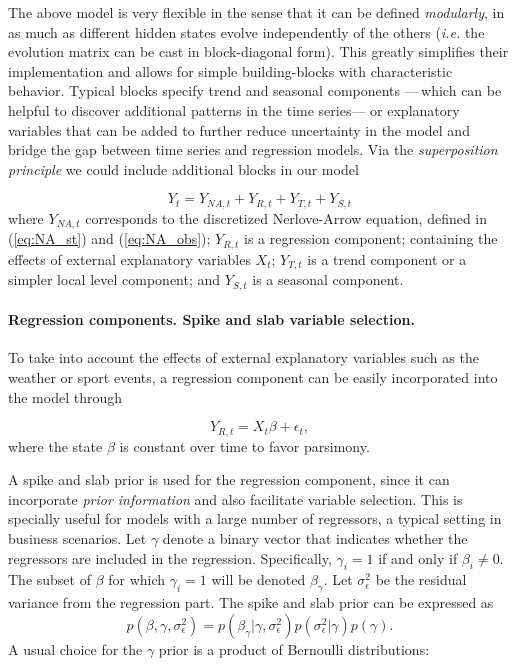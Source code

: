 The above model is very flexible in the sense that it can be defined \emph{modularly},  in as much as different hidden states evolve independently of the others (\emph{i.e.} the evolution matrix can be cast in block-diagonal form). This greatly simplifies their implementation and allows for simple building-blocks with characteristic behavior. Typical blocks specify trend and seasonal components ---\,which can be helpful to discover additional patterns in the time series--- or explanatory variables that can be added to further reduce  uncertainty in the model and bridge the gap between time series and regression models. Via the \emph{superposition principle} \parencite[Chapter 3]{petris2009dynamic} we could include additional blocks in our model

$$
Y_t = Y_{NA, t} + Y_{R, t} + Y_{T, t} + Y_{S, t}
$$
where $Y_{NA, t}$ corresponds to the discretized Nerlove-Arrow equation, defined in (\ref{eq:NA_st}) and (\ref{eq:NA_obs}); $Y_{R, t}$ is a regression component; containing the effects of  external explanatory variables $X_t$; $Y_{T, t}$ is a trend component or a simpler local level component; and $Y_{S, t}$ is a seasonal component.

\paragraph{Regression components. Spike and slab variable selection.}\label{sec:s_s}

To take into account the effects of external explanatory variables such as the weather or sport events, a  regression component can be easily incorporated into the model through

$$
Y_{R,t} = X_t \beta + \epsilon_t,
$$
where the state $\beta$ is constant over time to favor parsimony.

A spike and slab prior \parencite{mitchell1988bayesian} is used for the  regression component, since it can incorporate \emph{prior information} and also facilitate variable selection. This is specially useful for models with a large number of regressors, a typical setting in business scenarios.
Let $\gamma$ denote a binary vector that indicates whether the regressors are included in the regression. Specifically, $\gamma_i = 1$ if and only if $\beta_i \neq 0$. The subset of $\beta$ for which $\gamma_i = 1$ will be denoted $\beta_{\gamma}$. Let $\sigma^2_{\epsilon}$ be the residual variance from the regression part. The spike and slab prior \parencite{george1997approaches} can be expressed as
$$
p(\beta, \gamma, \sigma^2_{\epsilon}) = p(\beta_{\gamma} | \gamma, \sigma^2_{\epsilon})p(\sigma^2_{\epsilon} | \gamma)p(\gamma).
$$
A usual choice for the $\gamma$ prior is a product of Bernoulli distributions:

